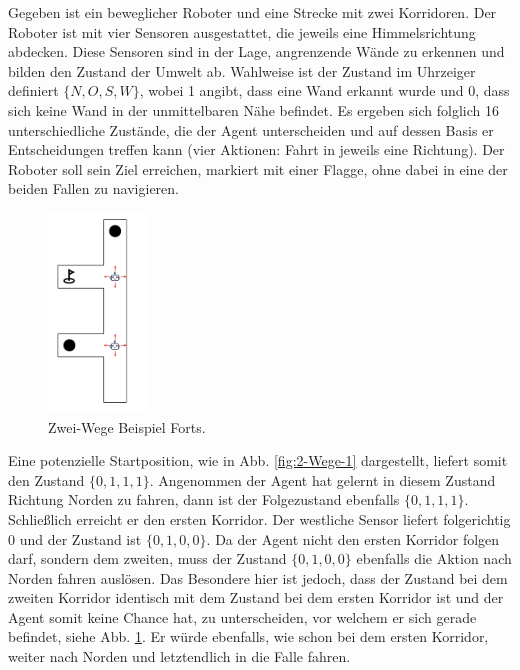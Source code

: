 Gegeben ist ein beweglicher Roboter und eine Strecke mit zwei Korridoren. Der Roboter ist mit vier Sensoren ausgestattet, die jeweils eine Himmelsrichtung abdecken. Diese Sensoren sind in der Lage, angrenzende Wände zu erkennen und bilden den Zustand der Umwelt ab. Wahlweise ist der Zustand im Uhrzeiger definiert $\{N, O, S, W\}$, wobei 1 angibt, dass eine Wand erkannt wurde und 0, dass sich keine Wand in der unmittelbaren Nähe befindet. Es ergeben sich folglich 16 unterschiedliche Zustände, die der Agent unterscheiden und auf dessen Basis er Entscheidungen treffen kann (vier Aktionen: Fahrt in jeweils eine Richtung). Der Roboter soll sein Ziel erreichen, markiert mit einer Flagge, ohne dabei in eine der beiden Fallen zu navigieren.
\par
\begin{figure}
  \begin{center}
  \includegraphics[height=200px]{images/2passagesStart.png}  \end{center}
  \caption{Zwei-Wege Beispiel Forts.}
  \label{fig:2-Wege-2}
\end{figure}

Eine potenzielle Startposition, wie in Abb. \ref{fig:2-Wege-1} dargestellt, liefert somit den Zustand $\{0, 1, 1, 1\}$. Angenommen der Agent hat gelernt in diesem Zustand Richtung Norden zu fahren, dann ist der Folgezustand ebenfalls $\{0, 1, 1, 1\}$. Schließlich erreicht er den ersten Korridor. Der westliche Sensor liefert folgerichtig 0 und der Zustand ist $\{0, 1, 0, 0\}$. Da der Agent nicht den ersten Korridor folgen darf, sondern dem zweiten, muss der Zustand $\{0, 1, 0, 0\}$ ebenfalls die Aktion \glqq nach Norden fahren\grqq{} auslösen. Das Besondere hier ist jedoch, dass der Zustand bei dem zweiten Korridor identisch mit dem Zustand bei dem ersten Korridor ist und der Agent somit keine Chance hat, zu unterscheiden, vor welchem er sich gerade befindet, siehe Abb. \ref{fig:2-Wege-2}. Er würde ebenfalls, wie schon bei dem ersten Korridor, weiter nach Norden und letztendlich in die Falle fahren.
\par 

